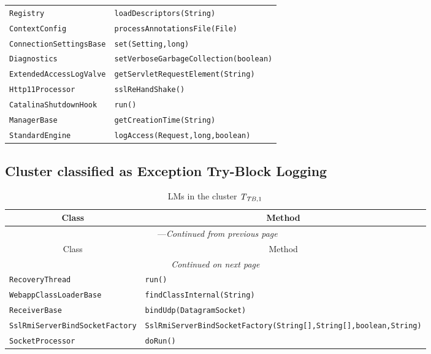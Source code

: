 \begin{center}
\begin{longtable}{ll}
\lstinline/Registry/&{\lstinline/loadDescriptors(String)/}\\
\lstinline/ContextConfig/&{\lstinline/processAnnotationsFile(File)/}\\
\lstinline/ConnectionSettingsBase/&{\lstinline/set(Setting,long)/}\\
\lstinline/Diagnostics/&{\lstinline/setVerboseGarbageCollection(boolean)/}\\
\lstinline/ExtendedAccessLogValve/&{\lstinline/getServletRequestElement(String)/}\\
\lstinline/Http11Processor/&{\lstinline/sslReHandShake()/}\\
\lstinline/CatalinaShutdownHook/&{\lstinline/run()/}\\
\lstinline/ManagerBase/&{\lstinline/getCreationTime(String)/}\\
\lstinline/StandardEngine/&{\lstinline/logAccess(Request,long,boolean)/}\\

\end{longtable}
\end{center}

\subsection{Cluster classified as Exception Try-Block Logging}

\begin{center}
\begin{longtable}{ll}
\caption{LMs in the cluster $\mathit{T}_{\mathit{TB},1}$}\\
\toprule\multicolumn{1}{c}{Class}&\multicolumn{1}{c}{Method}\\\midrule
\endfirsthead

\multicolumn{2}{c}{\tablename\ \thetable{}---\textit{Continued from previous page}} \\\midrule
\multicolumn{1}{c}{Class}&\multicolumn{1}{c}{Method}\\\midrule
\endhead
\multicolumn{2}{c}{\textit{Continued on next page}}\\\midrule
\endfoot
\bottomrule
\endlastfoot

\lstinline/RecoveryThread/&{\lstinline/run()/}\\
\lstinline/WebappClassLoaderBase/&{\lstinline/findClassInternal(String)/}\\
\lstinline/ReceiverBase/&{\lstinline/bindUdp(DatagramSocket)/}\\
\lstinline/SslRmiServerBindSocketFactory/&{\lstinline/SslRmiServerBindSocketFactory(String[],String[],boolean,String)/}\\
\lstinline/SocketProcessor/&{\lstinline/doRun()/}\\

\end{longtable}
\end{center}

